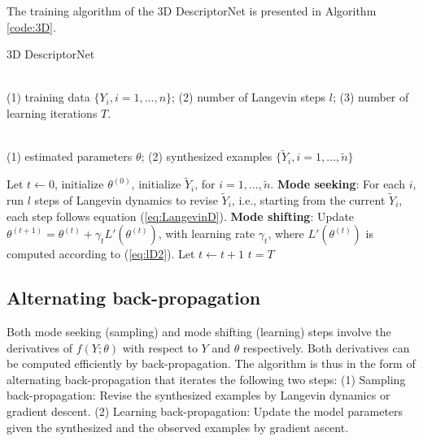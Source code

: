 \documentclass[10pt,twocolumn,letterpaper]{article}
\def\tY{\tilde{Y}}
\begin{document}
 
  The training algorithm of the 3D DescriptorNet is presented in Algorithm \ref{code:3D}.

\begin{algorithm}[h]
\caption{3D DescriptorNet}
\label{code:3D}
\begin{algorithmic}[1]
\REQUIRE ~~\\
(1) training data $\{Y_i, i=1,...,n\}$; (2) number of Langevin steps $l$; (3) number of learning iterations $T$.

\ENSURE~~\\
(1) estimated parameters $\theta$; (2) synthesized examples $\{\tY_i, i = 1, ..., \tilde{n}\}$ 

\item[] 
\STATE Let $t\leftarrow 0$, initialize $\theta^{(0)}$, initialize $\tY_i$, for $i = 1, ..., \tilde{n}$. 
\REPEAT 
\STATE \textbf{Mode seeking}: For each $i$, run $l$ steps of Langevin dynamics to revise $\tY_i$, i.e., starting from the current $\tY_i$, each step follows equation (\ref{eq:LangevinD}). 
\STATE \textbf{Mode shifting}: Update $\theta^{(t+1)} = \theta^{(t)} + \gamma_t L'(\theta^{(t)}) $,  with learning rate $\gamma_t$, where $L'(\theta^{(t)})$ is computed according to (\ref{eq:lD2}). 
\STATE Let $t \leftarrow t+1$
\UNTIL $t = T$
\end{algorithmic}
\end{algorithm}



  \subsection{Alternating back-propagation} 

Both mode seeking (sampling) and mode shifting (learning) steps involve the derivatives of $f(Y;\theta)$ with respect to $Y$ and $\theta$ respectively. Both derivatives can be computed efficiently by back-propagation. The algorithm is thus in the form of alternating back-propagation that iterates the following two steps: (1) Sampling back-propagation: Revise the synthesized examples by Langevin dynamics or gradient descent.
(2) Learning back-propagation: Update the model parameters
given the synthesized and the observed examples by gradient ascent. 
\end{document}
